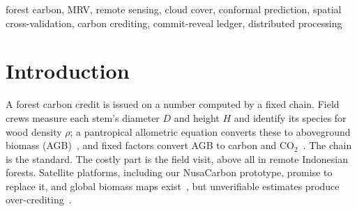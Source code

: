 \documentclass[conference,a4paper]{IEEEtran}
\begin{document}
\begin{abstract}
Satellite platforms promise to replace field inventories in forest carbon crediting, but their estimates are rarely tested blind against the standard-formula answer. We separate the question into two isolated grids. The right grid computes sealed field ground truth to SNI 7724, IPCC, CDM, and Verra rules. The left grid sees only plot coordinates and dates and estimates carbon from time-matched Sentinel-1/2, Landsat, PALSAR, canopy height, and GEDI lidar. On 476 plots, blind error was 21\% on 1\,ha plots and 7--9\% on project totals outside Indonesia, near 100\% on small Indonesian plots. Counting trees on a 1\,m canopy height map found 3\% of the stems and 25\% of the carbon (62\% on the 2026 map). In 1{,}000 simulated projects the best map found a median 95\% of the field carbon; satellite embeddings and a regional bias correction raised the share within $\pm25$\% from 80\% to 88.5\%, and on 35 unseen Bornean plots the frozen method found 85\%. We propose conformal crediting, a lower bound calibrated on other projects with field truth. It met a 10\% over-crediting target for five maps within 2.9 points, was invariant to map inflation, and credited 72--84\% of the true stock without a field plot; the VM0047 deduction over-credited 23--29\% of projects with field plots. No satellite estimate of annual growth beat assuming no change.
\end{abstract}

\begin{IEEEkeywords}
forest carbon, MRV, remote sensing, cloud cover, conformal prediction, spatial cross-validation, carbon crediting, commit-reveal ledger, distributed processing
\end{IEEEkeywords}

\section{Introduction}
A forest carbon credit is issued on a number computed by a fixed chain. Field crews measure each stem's diameter $D$ and height $H$ and identify its species for wood density $\rho$; a pantropical allometric equation converts these to aboveground biomass (AGB)~\cite{chave2014improved}, and fixed factors convert AGB to carbon and CO$_2$~\cite{verra2025vm0047,ipcc2019v4}. The chain is the standard. The costly part is the field visit, above all in remote Indonesian forests. Satellite platforms, including our NusaCarbon prototype, promise to replace it, and global biomass maps exist~\cite{santoro2021global,chloris2022}, but unverifiable estimates produce over-crediting~\cite{west2023redd}.
\end{document}
